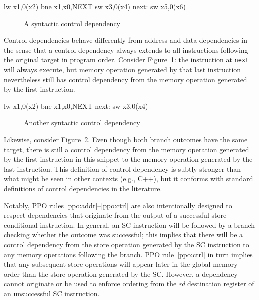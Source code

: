 \begin{verbbox}
      lw  x1,0(x2)
      bne x1,x0,NEXT
      sw  x3,0(x4)
next: sw  x5,0(x6)
\end{verbbox}
\begin{figure}[h!]
  \centering\small
  \theverbbox
  \caption{A syntactic control dependency}
  \label{fig:litmus:control1}
\end{figure}

Control dependencies behave differently from address and data dependencies in the sense that a control dependency always extends to all instructions following the original target in program order.
Consider Figure~\ref{fig:litmus:control1}: the instruction at {\tt next} will always execute, but memory operation generated by that last instruction nevertheless still has control dependency from the memory operation generated by the first instruction.

\begin{verbbox}
        lw  x1,0(x2)
        bne x1,x0,NEXT
  next: sw  x3,0(x4)
\end{verbbox}
\begin{figure}[h!]
  \centering\small
  \theverbbox
  \caption{Another syntactic control dependency}
  \label{fig:litmus:control2}
\end{figure}

Likewise, consider Figure~\ref{fig:litmus:control2}.
Even though both branch outcomes have the same target, there is still a control dependency from the memory operation generated by the first instruction in this snippet to the memory operation generated by the last instruction.
This definition of control dependency is subtly stronger than what might be seen in other contexts (e.g., C++), but it conforms with standard definitions of control dependencies in the literature.

Notably, PPO rules \ref{ppo:addr}--\ref{ppo:ctrl} are also intentionally designed to respect dependencies that originate from the output of a successful store conditional instruction.
In general, an SC instruction will be followed by a branch checking whether the outcome was successful; this implies that there will be a control dependency from the store operation generated by the SC instruction to any memory operations following the branch.
PPO rule~\ref{ppo:ctrl} in turn implies that any subsequent store operations will appear later in the global memory order than the store operation generated by the SC.
However, a dependency cannot originate or be used to enforce ordering from the {\em rd} destination register of an unsuccessful SC instruction.


